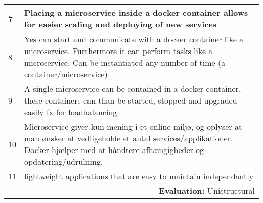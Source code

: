 \begin{longtable}{|p{0.3cm}|p{14.7cm}|}
7 & Placing a microservice inside a docker container allows for easier scaling and deploying of new services \\ \hline

8 & Yes can start and communicate with a docker container like a microservice. Furthermore it can perform tasks like a microservice. Can be instantiated any number of time (a container/microservice)\\ \hline

9 & A single microservice can be contained in a docker container, these containers can than be started, stopped and upgraded easily fx for loadbalancing\\ \hline

10 & Microservice giver kun mening i et online miljø, og oplyser at man ønsker at vedligeholde et antal services/applikationer. Docker hjælper med at håndtere afhængigheder og opdatering/udrulning.\\ \hline

11 & lightweight applications that are easy to maintain independantly\\ \hline


\multicolumn{2}{r}{\textbf{Evaluation:} Unistructural} \\ 
\end{longtable}
\normalsize


